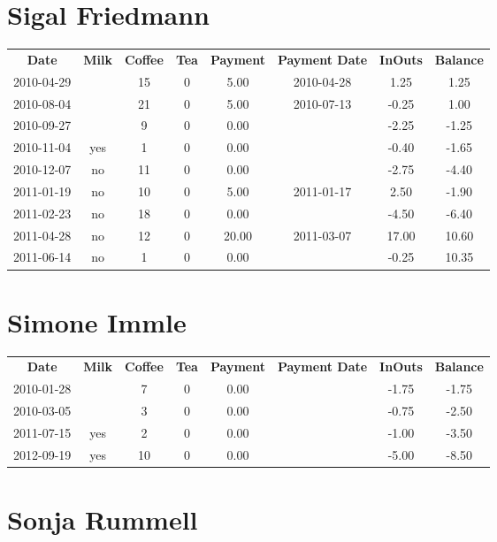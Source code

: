 \section{Sigal Friedmann}

\begin{center}
\begin{tabular}{cccccccc}
\textbf{Date} & \textbf{Milk} & \textbf{Coffee} & \textbf{Tea} & \textbf{Payment} & \textbf{Payment Date} & \textbf{InOuts} & \textbf{Balance} \\
2010-04-29 &  & 15 & 0 &  5.00 & 2010-04-28 &  1.25 &  1.25\\ 
2010-08-04 &  & 21 & 0 &  5.00 & 2010-07-13 & -0.25 &  1.00\\ 
2010-09-27 &  &  9 & 0 &  0.00 &  & -2.25 & -1.25\\ 
2010-11-04 & yes &  1 & 0 &  0.00 &  & -0.40 & -1.65\\ 
2010-12-07 & no & 11 & 0 &  0.00 &  & -2.75 & -4.40\\ 
2011-01-19 & no & 10 & 0 &  5.00 & 2011-01-17 &  2.50 & -1.90\\ 
2011-02-23 & no & 18 & 0 &  0.00 &  & -4.50 & -6.40\\ 
2011-04-28 & no & 12 & 0 & 20.00 & 2011-03-07 & 17.00 & 10.60\\ 
2011-06-14 & no &  1 & 0 &  0.00 &  & -0.25 & 10.35
\end{tabular}
\end{center}

\section{Simone Immle}

\begin{center}
\begin{tabular}{cccccccc}
\textbf{Date} & \textbf{Milk} & \textbf{Coffee} & \textbf{Tea} & \textbf{Payment} & \textbf{Payment Date} & \textbf{InOuts} & \textbf{Balance} \\
2010-01-28 &  &  7 & 0 & 0.00 &  & -1.75 & -1.75\\ 
2010-03-05 &  &  3 & 0 & 0.00 &  & -0.75 & -2.50\\ 
2011-07-15 & yes &  2 & 0 & 0.00 &  & -1.00 & -3.50\\ 
2012-09-19 & yes & 10 & 0 & 0.00 &  & -5.00 & -8.50
\end{tabular}
\end{center}

\section{Sonja Rummell}

